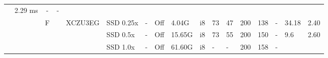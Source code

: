 \begin{table}
\begin{adjustbox}{totalheight=\baselineskip,}
\begin{tabular}{ccccclp{2em}cp{3em}cp{2em}p{4em}p{3em}p{3.5em}p{3.5em}p{2.5em}p{3em}}
                                                       &\multirow{1}{*}{2.29 ms}
                                                           &\multirow{1}{*}{-}
                                                               &\multirow{1}{*}{-}\\
\cmidrule{3-17}
   &   &\multirow{3}{*}{F}
           &\multirow{3}{*}{\cite{suhAlgorithmHardwareCoOptimizationEnergyEfficient2021}}
               &\multirow{3}{*}{XCZU3EG}
                   &\multirow{1}{*}{SSD 0.25x}
                       &\multirow{1}{*}{-}
                           &\multirow{1}{*}{Off}
                               &\multirow{1}{*}{4.04G}
                                   &\multirow{1}{*}{i8}
                                       &\multirow{1}{*}{73}
                                           &\multirow{1}{*}{47}
                                               &\multirow{1}{*}{200}
                                                   &\multirow{1}{*}{138}
                                                       &\multirow{1}{*}{-}
                                                           &\multirow{1}{*}{34.18}
                                                               &\multirow{1}{*}{2.40}\\
   &   &   &   &   &\multirow{1}{*}{SSD 0.5x}
                       &\multirow{1}{*}{-}
                           &\multirow{1}{*}{Off}
                               &\multirow{1}{*}{15.65G}
                                   &\multirow{1}{*}{i8}
                                       &\multirow{1}{*}{73}
                                           &\multirow{1}{*}{55}
                                               &\multirow{1}{*}{200}
                                                   &\multirow{1}{*}{150}
                                                       &\multirow{1}{*}{-}
                                                           &\multirow{1}{*}{9.6}
                                                               &\multirow{1}{*}{2.60}\\
   &   &   &   &   &\multirow{1}{*}{SSD 1.0x}
                       &\multirow{1}{*}{-}
                           &\multirow{1}{*}{Off}
                               &\multirow{1}{*}{61.60G}
                                   &\multirow{1}{*}{i8}
                                       &\multirow{1}{*}{-}
                                           &\multirow{1}{*}{-}
                                               &\multirow{1}{*}{200}
                                                   &\multirow{1}{*}{158}
                                                       &\multirow{1}{*}{-}

\end{tabular}
\end{adjustbox}
\end{table}
